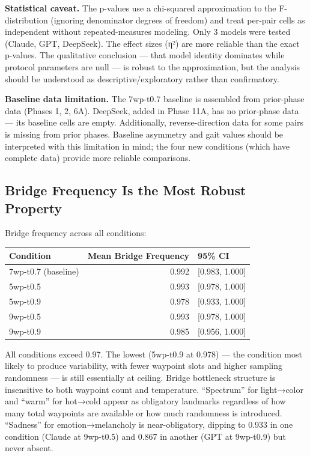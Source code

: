 \textbf{Statistical caveat.} The p-values use a chi-squared approximation to the F-distribution (ignoring denominator degrees of freedom) and treat per-pair cells as independent without repeated-measures modeling. Only 3 models were tested (Claude, GPT, DeepSeek). The effect sizes (η²) are more reliable than the exact p-values. The qualitative conclusion --- that model identity dominates while protocol parameters are null --- is robust to the approximation, but the analysis should be understood as descriptive/exploratory rather than confirmatory.

\textbf{Baseline data limitation.} The 7wp-t0.7 baseline is assembled from prior-phase data (Phases 1, 2, 6A). DeepSeek, added in Phase 11A, has no prior-phase data --- its baseline cells are empty. Additionally, reverse-direction data for some pairs is missing from prior phases. Baseline asymmetry and gait values should be interpreted with this limitation in mind; the four new conditions (which have complete data) provide more reliable comparisons.

\subsection{Bridge Frequency Is the Most Robust Property}\label{bridge-frequency-is-the-most-robust-property}

Bridge frequency across all conditions:

\begin{longtable}[]{@{}lrl@{}}
\toprule\noalign{}
Condition & Mean Bridge Frequency & 95\% CI \\
\midrule\noalign{}
\endhead
\bottomrule\noalign{}
\endlastfoot
7wp-t0.7 (baseline) & 0.992 & {[}0.983, 1.000{]} \\
5wp-t0.5 & 0.993 & {[}0.978, 1.000{]} \\
5wp-t0.9 & 0.978 & {[}0.933, 1.000{]} \\
9wp-t0.5 & 0.993 & {[}0.978, 1.000{]} \\
9wp-t0.9 & 0.985 & {[}0.956, 1.000{]} \\
\end{longtable}

All conditions exceed 0.97. The lowest (5wp-t0.9 at 0.978) --- the condition most likely to produce variability, with fewer waypoint slots and higher sampling randomness --- is still essentially at ceiling. Bridge bottleneck structure is insensitive to both waypoint count and temperature. ``Spectrum'' for light→color and ``warm'' for hot→cold appear as obligatory landmarks regardless of how many total waypoints are available or how much randomness is introduced. ``Sadness'' for emotion→melancholy is near-obligatory, dipping to 0.933 in one condition (Claude at 9wp-t0.5) and 0.867 in another (GPT at 9wp-t0.9) but never absent.

